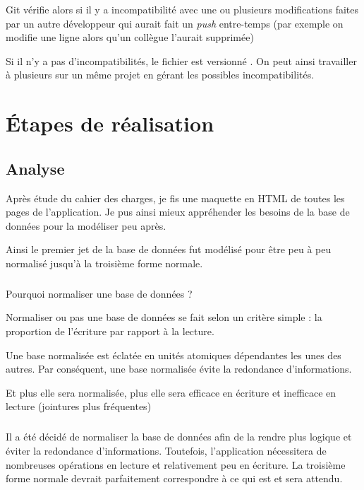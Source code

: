 \documentclass[a4paper,12pt,titlepage]{report}
\begin{document}
Git vérifie alors si il y a incompatibilité avec une ou plusieurs modifications faites par un autre développeur qui aurait fait un \emph{push} entre-temps (par exemple on modifie une ligne alors qu'un collègue l'aurait supprimée)

Si il n'y a pas d'incompatibilités, le fichier est \og versionné \fg{} . On peut ainsi travailler à plusieurs sur un même projet en gérant les possibles incompatibilités.



\chapter{Étapes de réalisation}

\section{Analyse}

Après étude du cahier des charges, je fis une maquette en HTML de toutes les pages de l'application. Je pus ainsi mieux appréhender les besoins de la base de données pour la modéliser peu après.

Ainsi le premier jet de la base de données fut modélisé pour être peu à peu normalisé jusqu'à la troisième forme normale.
\paragraph*{}
Pourquoi normaliser une base de données ?

Normaliser ou pas une base de données se fait selon un critère simple : la proportion de l'écriture par rapport à la lecture.

Une base normalisée est éclatée en unités atomiques dépendantes les unes des autres.
Par conséquent, une base normalisée évite la redondance d'informations.

Et plus elle sera normalisée, plus elle sera efficace en écriture et inefficace en lecture (jointures plus fréquentes)

\paragraph*{}
Il a été décidé de normaliser la base de données afin de la rendre plus logique et éviter la redondance d'informations. Toutefois, l'application nécessitera de nombreuses opérations en lecture et relativement peu en écriture. La troisième forme normale devrait parfaitement correspondre à ce qui est et sera attendu.
\end{document}
